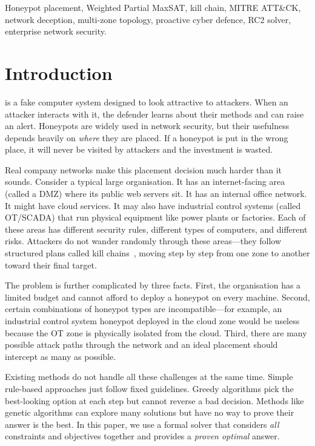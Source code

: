\documentclass[journal]{IEEEtran}
\begin{document}
\begin{IEEEkeywords}
Honeypot placement, Weighted Partial MaxSAT, kill chain,
MITRE ATT\&CK, network deception, multi-zone topology,
proactive cyber defence, RC2 solver, enterprise network
security.
\end{IEEEkeywords}

\section{Introduction}
\label{sec:intro}

 is a fake computer system
designed to look attractive to attackers.
When an attacker interacts with it, the defender learns about
their methods and can raise an alert.
Honeypots are widely used in network security, but their
usefulness depends heavily on \emph{where} they are placed.
If a honeypot is put in the wrong place, it will never be
visited by attackers and the investment is wasted.

Real company networks make this placement decision much
harder than it sounds.
Consider a typical large organisation.
It has an internet-facing area (called a DMZ) where its
public web servers sit.
It has an internal office network.
It might have cloud services.
It may also have industrial control systems (called OT/SCADA)
that run physical equipment like power plants or factories.
Each of these areas has different security rules, different
types of computers, and different risks.
Attackers do not wander randomly through these areas---they
follow structured plans called kill chains~\cite{hutchins2011},
moving step by step from one zone to another toward their
final target.

The problem is further complicated by three facts.
First, the organisation has a limited budget and cannot afford
to deploy a honeypot on every machine.
Second, certain combinations of honeypot types are
incompatible---for example, an industrial control system
honeypot deployed in the cloud zone would be useless because
the OT zone is physically isolated from the cloud.
Third, there are many possible attack paths through the
network and an ideal placement should intercept as many as
possible.

Existing methods do not handle all these challenges at the
same time.
Simple rule-based approaches just follow fixed guidelines.
Greedy algorithms pick the best-looking option at each step
but cannot reverse a bad decision.
Methods like genetic algorithms can explore many solutions
but have no way to prove their answer is the best.
In this paper, we use a formal solver that considers
\emph{all} constraints and objectives together and provides
a \emph{proven optimal} answer.
\end{document}
